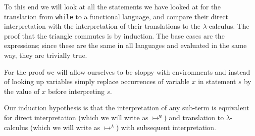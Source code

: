 \documentclass[11pt, leqno, titlepage]{article}
\theoremstyle{definition}
\begin{document}
To this end we will look at all the statements we have looked at for the translation
from \texttt{while} to a functional language, and compare their direct interpretation
with the interpretation of their translations to the $\lambda$-calculus.  The proof
that the triangle commutes is by induction. The base cases are the expressions; since
these are the same in all languages and evaluated in the same way, they are trivially
true.

For the proof we will allow ourselves to be sloppy with environments and instead of
looking up variables simply replace occurrences of variable $x$ in statement $s$ by
the value of $x$ before interpreting $s$.

Our induction hypothesis is that the interpretation of any sub-term is equivalent for
direct interpretation (which we will write as $\mapsto^{\texttt{w}}$) and translation
to $\lambda$-calculus (which we will write as $\mapsto^\lambda$) with subsequent
interpretation. 
\end{document}

